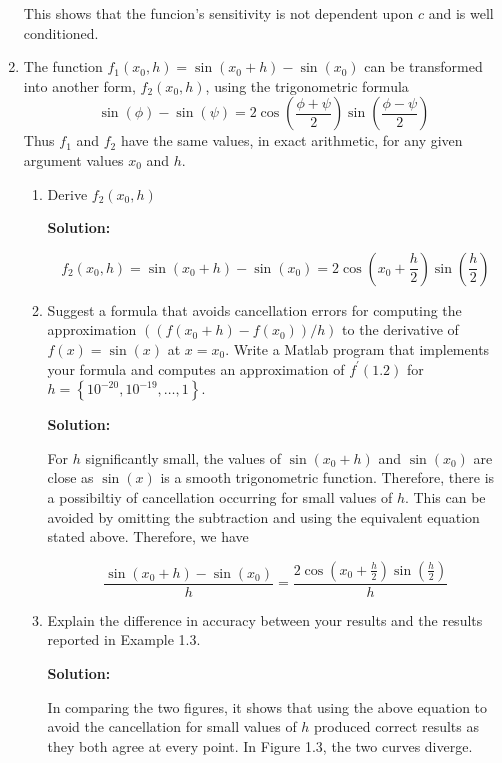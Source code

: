 \documentclass[12pt]{article}
\begin{document}
\begin{enumerate}
This shows that the funcion's sensitivity is not dependent upon $c$ and is well conditioned.


\item The function $f_{1}\left(x_{0},h\right) = \sin\left(x_{0}+h\right) - \sin\left(x_{0}\right)$
can be transformed into another form, $f_{2}\left(x_{0},h\right)$, using the
trigonometric formula
\[
\sin(\phi) - \sin(\psi) = 2\cos\left(\frac{\phi + \psi}{2}\right)\sin\left(\frac{\phi - \psi}{2}\right)
\]
Thus $f_{1}$ and $f_{2}$ have the same values, in exact arithmetic, for any given
argument values $x_{0}$ and $h$.
\begin{enumerate}
\item Derive $f_{2}\left(x_{0},h\right)$

{\bf Solution:}

\[
f_{2}\left(x_{0},h\right) = \sin\left(x_{0} + h\right) - \sin\left(x_{0}\right) = 2\cos\left(x_{0} + \frac{h}{2}\right)\sin\left(\frac{h}{2}\right)
\]
\item Suggest a formula that avoids cancellation errors for computing the approximation
$\left(\left( f\left( x_{0}+h\right) - f\left(x_{0}\right)\right) /h\right)$
to the derivative of $f(x)=\sin(x)$ at $x=x_{0}$. Write a {\sc Matlab} program
that implements your formula and computes an approximation of $f^{\prime}(1.2)$
for $h = \left\{ 10^{-20},10^{-19},\ldots,1\right\}$.

{\bf Solution:}

For $h$ significantly small, the values of $\sin\left(x_{0} + h\right)$ and $\sin\left(x_{0}\right)$
are close as $\sin(x)$ is a smooth trigonometric function. Therefore, there is
a possibiltiy of cancellation occurring for small values of $h$. This can be avoided
by omitting the subtraction and using the equivalent equation stated above. Therefore,
we have

\[
\frac{\sin\left(x_{0}+h\right) - \sin\left(x_{0}\right)}{h} = \frac{2\cos\left(x_{0} + \frac{h}{2}\right)\sin\left(\frac{h}{2}\right)}{h}
\]
\item Explain the difference in accuracy between your results and the results
reported in Example 1.3.

{\bf Solution:}

In comparing the two figures, it shows that using the above equation to avoid the
cancellation for small values of $h$ produced correct results as they both agree
at every point. In Figure 1.3, the two curves diverge.
\end{enumerate}


\end{enumerate}
\end{document}
